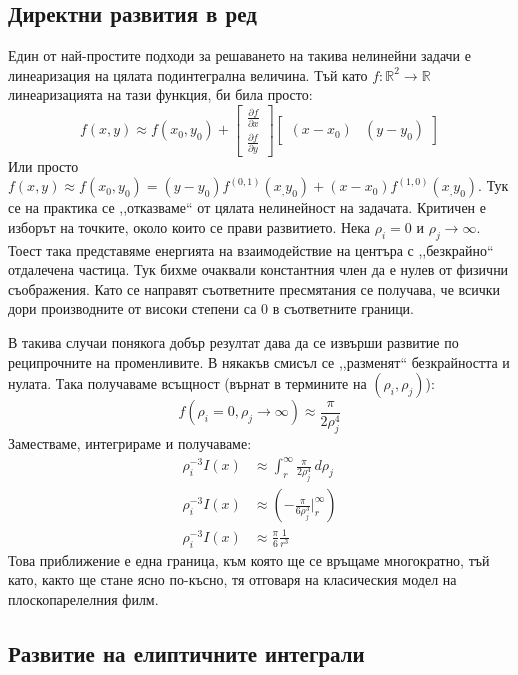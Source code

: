 \subsection{Директни развития в ред}
Един от най-простите подходи за решаването на такива нелинейни задачи е линеаризация на цялата подинтегрална величина. Тъй като $f: \mathbb{R}^2 \rightarrow \mathbb{R}$ линеаризацията на тази функция, би била просто:
\begin{equation*}
	f(x,y) \approx f(x_0,y_0) + \begin{bmatrix}
		\frac{\partial f}{\partial x} \\
		\frac{\partial f}{\partial y} 
	\end{bmatrix} 
	\begin{bmatrix}
		(x-x_0) & (y-y_0)
	\end{bmatrix}
\end{equation*}
Или просто $f(x,y) \approx f(x_0, y_0) = (y-y_0) f^{(0,1)}(x_,y_0)+ (x-x_0) f^{(1,0)}(x_,y_0)$.
Тук се на практика се ,,отказваме`` от цялата нелинейност на задачата. Критичен е изборът на точките, около които се прави развитието.
Нека $\rho_i = 0$ и $\rho_j \rightarrow \infty$. Тоест така представяме енергията на взаимодействие на центъра с ,,безкрайно`` отдалечена частица.
Тук бихме очаквали константния член да е нулев от физични съображения. Като се направят съответните пресмятания се получава, че всички дори производните от високи степени са 0 в съответните граници.

В такива случаи понякога добър резултат дава да се извърши развитие по реципрочните на променливите. В някакъв смисъл се ,,разменят`` безкрайността и нулата.
Така получаваме всъщност (върнат в термините на $(\rho_i, \rho_j)$):
\begin{equation*}
	f(\rho_i = 0, \rho_j \rightarrow \infty) \approx \frac{\pi}{2 \rho_{j}^4}
\end{equation*}
Заместваме, интегрираме и получаваме:
\begin{align*}
	\rho_{i}^{-3} I(x) &\approx \displaystyle\int_{r}^{\infty} \frac{\pi}{2 \rho_{j}^4}  \,d\rho_j \\
	\rho_{i}^{-3} I(x) &\approx  \left( -\frac{\pi }{6 \rho_j^3}\big|_{r}^{\infty}  \right) \\
	\rho_{i}^{-3} I(x) &\approx \frac{\pi}{6} \frac{1}{r^3} 
\end{align*}
Това приближение е една граница, към която ще се връщаме многократно, тъй като, както ще стане ясно по-късно, тя отговаря на класическия модел на плоскопарелелния филм.

\subsection{Развитие на елиптичните интеграли}
